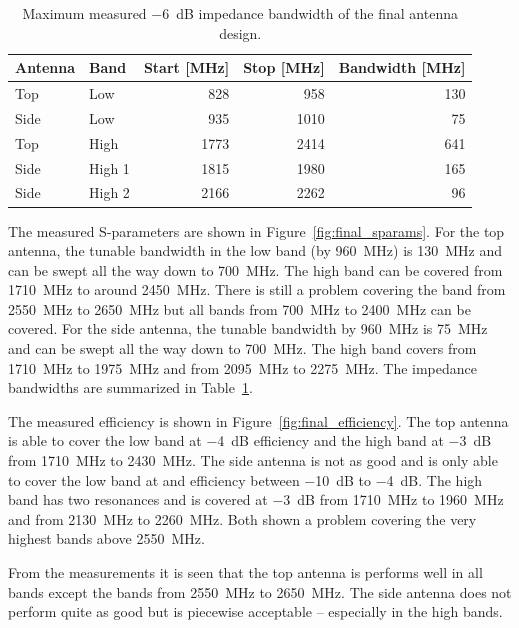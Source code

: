 \begin{table}
    \centering
    \begin{tabular}{|l|l|r|r|r|}
        \hline
        Antenna & Band & Start [MHz] & Stop [MHz] & Bandwidth [MHz] \\
        \hline
        Top & Low & 828 & 958 & 130 \\
        Side & Low & 935 & 1010 & 75 \\
        \hline
        Top & High    & 1773 & 2414 & 641 \\
        Side & High 1 & 1815 & 1980 & 165 \\
        Side & High 2 & 2166 & 2262 &  96 \\
        \hline
    \end{tabular}
    \caption{Maximum measured \SI{-6}{dB} impedance bandwidth of the final antenna design.}
    \label{tab:final_bandwidths}
\end{table}


The measured S-parameters are shown in Figure~\ref{fig:final_sparams}. For the top antenna, the tunable bandwidth in the low band (by \SI{960}{MHz}) is \SI{130}{MHz} and can be swept all the way down to \SI{700}{MHz}. The high band can be covered from \SI{1710}{MHz} to around \SI{2450}{MHz}. There is still a problem covering the band from \SI{2550}{MHz} to \SI{2650}{MHz} but all bands from \SI{700}{MHz} to \SI{2400}{MHz} can be covered. For the side antenna, the tunable bandwidth by \SI{960}{MHz} is \SI{75}{MHz} and can be swept all the way down to \SI{700}{MHz}. The high band covers from \SI{1710}{MHz} to \SI{1975}{MHz} and from \SI{2095}{MHz} to \SI{2275}{MHz}. The impedance bandwidths are summarized in Table~\ref{tab:final_bandwidths}.

The measured efficiency is shown in Figure~\ref{fig:final_efficiency}. The top antenna is able to cover the low band at \SI{-4}{dB} efficiency and the high band at \SI{-3}{dB} from \SI{1710}{MHz} to \SI{2430}{MHz}. The side antenna is not as good and is only able to cover the low band at and efficiency between \SI{-10}{dB} to \SI{-4}{dB}. The high band has two resonances and is covered at \SI{-3}{dB} from \SI{1710}{MHz} to \SI{1960}{MHz} and from \SI{2130}{MHz} to \SI{2260}{MHz}. Both shown a problem covering the very highest bands above \SI{2550}{MHz}.


From the measurements it is seen that the top antenna is performs well in all bands except the bands from \SI{2550}{MHz} to \SI{2650}{MHz}. The side antenna does not perform quite as good but is piecewise acceptable -- especially in the high bands.

